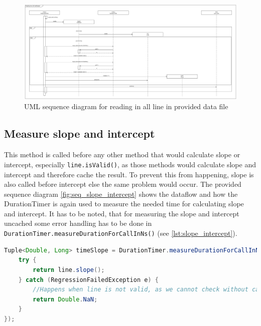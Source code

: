 \begin{landscape}
    \begin{figure}
        \begin{center}
            \includegraphics[width=1.75\textwidth, height=0.99\textheight]{img/sequence_read.png}
            \caption{UML sequence diagram for reading in all line in provided data file}
            \label{fig:seq_read}
        \end{center}
    \end{figure}
\end{landscape}

\subsection{Measure slope and intercept}
This method is called before any other method that would calculate slope or intercept, especially \texttt{line.isValid()}, as those methods would calculate slope and intercept and therefore cache the result. To prevent this from happening, slope is also called before intercept else the same problem would occur. The provided sequence diagram \ref{fig:seq_slope_intercept} shows the dataflow and how the DurationTimer is again used to measure the needed time for calculating slope and intercept. It has to be noted, that for measuring the slope and intercept uncached some error handling has to be done in \texttt{DurationTimer.measureDurationForCallInNs()} (see \ref{lst:slope_intercept}).

\begin{lstlisting}[language=java, caption=Error handling in supplier for unchaced slope and intercept, label=lst:slope_intercept]
Tuple<Double, Long> timeSlope = DurationTimer.measureDurationForCallInNs(()-> {
    try {
        return line.slope();
    } catch (RegressionFailedException e) {
        //Happens when line is not valid, as we cannot check without caching slope and intercept
        return Double.NaN;
    }
});
\end{lstlisting}

